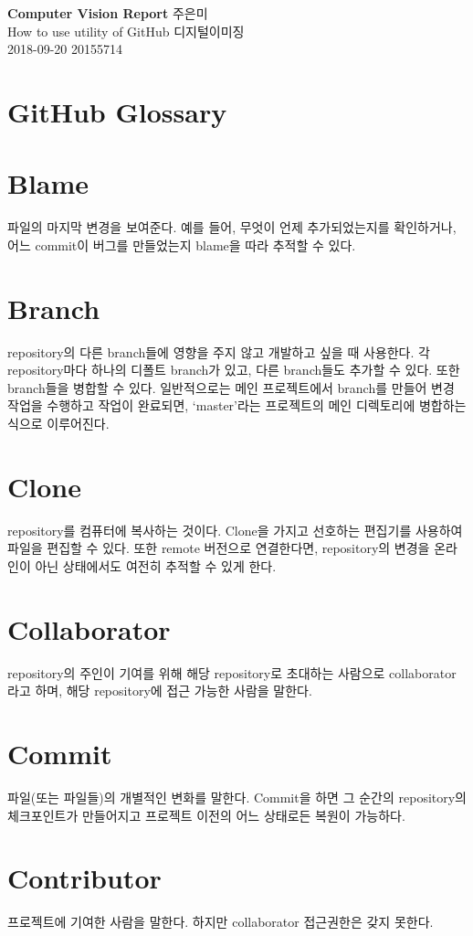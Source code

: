\documentclass[a4paper, 11pt]{article}
\begin{document}
\noindent
\large\textbf{Computer Vision Report}  \hfill {주은미} \\
\normalsize How to use utility of GitHub \hfill 디지털이미징 \\
 2018-09-20  \hfill 20155714

\section{GitHub Glossary}
\section*{Blame}
파일의 마지막 변경을 보여준다. 예를 들어, 무엇이 언제 추가되었는지를 확인하거나, 어느 commit이 버그를 만들었는지 blame을 따라 추적할 수 있다.

\section*{Branch}
repository의 다른 branch들에 영향을 주지 않고 개발하고 싶을 때 사용한다. 각 repository마다 하나의 디폴트 branch가 있고, 다른 branch들도 추가할 수 있다. 또한 branch들을 병합할 수 있다. 일반적으로는 메인 프로젝트에서 branch를 만들어 변경 작업을 수행하고 작업이 완료되면, ‘master’라는 프로젝트의 메인 디렉토리에 병합하는 식으로 이루어진다.

\section*{Clone}
repository를 컴퓨터에 복사하는 것이다. Clone을 가지고 선호하는 편집기를 사용하여 파일을 편집할 수 있다. 또한 remote 버전으로 연결한다면, repository의 변경을 온라인이 아닌 상태에서도 여전히 추적할 수 있게 한다.


\section*{Collaborator}
 repository의 주인이 기여를 위해 해당 repository로 초대하는 사람으로 collaborator라고 하며, 해당 repository에 접근 가능한 사람을 말한다.

\section*{Commit}
파일(또는 파일들)의 개별적인 변화를 말한다. Commit을 하면 그 순간의 repository의 체크포인트가 만들어지고 프로젝트 이전의 어느 상태로든 복원이 가능하다.

\section*{Contributor}
프로젝트에 기여한 사람을 말한다. 하지만 collaborator 접근권한은 갖지 못한다.
\end{document}
